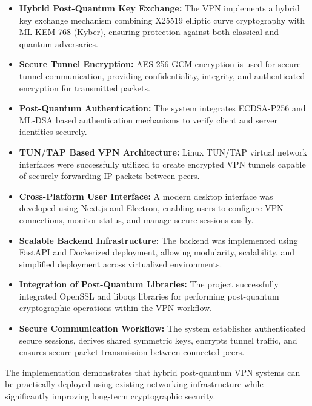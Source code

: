 \begin{itemize}

    \item \textbf{Hybrid Post-Quantum Key Exchange:}
    The VPN implements a hybrid key exchange mechanism combining X25519 elliptic curve cryptography with ML-KEM-768 (Kyber), ensuring protection against both classical and quantum adversaries.

    \item \textbf{Secure Tunnel Encryption:}
    AES-256-GCM encryption is used for secure tunnel communication, providing confidentiality, integrity, and authenticated encryption for transmitted packets.

    \item \textbf{Post-Quantum Authentication:}
    The system integrates ECDSA-P256 and ML-DSA based authentication mechanisms to verify client and server identities securely.

    \item \textbf{TUN/TAP Based VPN Architecture:}
    Linux TUN/TAP virtual network interfaces were successfully utilized to create encrypted VPN tunnels capable of securely forwarding IP packets between peers.

    \item \textbf{Cross-Platform User Interface:}
    A modern desktop interface was developed using Next.js and Electron, enabling users to configure VPN connections, monitor status, and manage secure sessions easily.

    \item \textbf{Scalable Backend Infrastructure:}
    The backend was implemented using FastAPI and Dockerized deployment, allowing modularity, scalability, and simplified deployment across virtualized environments.

    \item \textbf{Integration of Post-Quantum Libraries:}
    The project successfully integrated OpenSSL and liboqs libraries for performing post-quantum cryptographic operations within the VPN workflow.

    \item \textbf{Secure Communication Workflow:}
    The system establishes authenticated secure sessions, derives shared symmetric keys, encrypts tunnel traffic, and ensures secure packet transmission between connected peers.

\end{itemize}

The implementation demonstrates that hybrid post-quantum VPN systems can be practically deployed using existing networking infrastructure while significantly improving long-term cryptographic security.

